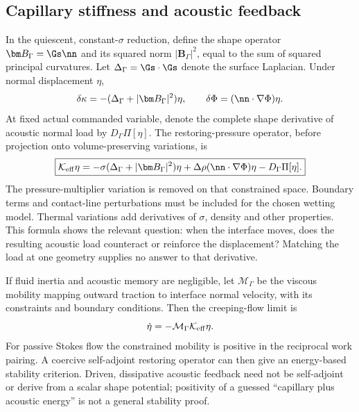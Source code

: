 \subsection{Capillary stiffness and acoustic feedback}
In the quiescent, constant-$\sigma$ reduction, define the shape operator
$\bm B_\Gamma=\Gs\nn$ and its squared norm $|\bm B_\Gamma|^2$, equal to the sum
of squared principal curvatures. Let $\Delta_\Gamma=\Gs\cdot\Gs$ denote the
surface Laplacian. Under normal displacement $\eta$,
\begin{equation}
 \delta\kappa=-(\Delta_\Gamma+|\bm B_\Gamma|^2)\eta,
 \qquad \delta\Phi=(\nn\cdot\nabla\Phi)\eta.
 \label{eq:curvature-variation}
\end{equation}
At fixed actual commanded variable, denote the complete shape derivative of
acoustic normal load by $D_\Gamma\Pi[\eta]$. The restoring-pressure operator,
before projection onto volume-preserving variations, is
\begin{equation}
 \boxed{\mathcal K_{\rm eff}\eta
 =-\sigma(\Delta_\Gamma+|\bm B_\Gamma|^2)\eta
    +\Delta\rho(\nn\cdot\nabla\Phi)\eta
    -D_\Gamma\Pi[\eta].}
 \label{eq:effective-stiffness}
\end{equation}
The pressure-multiplier variation is removed on that constrained space. Boundary
terms and contact-line perturbations must be included for the chosen wetting
model. Thermal variations add derivatives of $\sigma$, density and other
properties. This formula shows the relevant question: when the interface moves,
does the resulting acoustic load counteract or reinforce the displacement?
Matching the load at one geometry supplies no answer to that derivative.

If fluid inertia and acoustic memory are negligible, let $\mathcal M_\Gamma$
be the viscous mobility mapping outward traction to interface normal velocity,
with its constraints and boundary conditions. Then the creeping-flow limit is
\begin{equation}
 \dot\eta=-\mathcal M_\Gamma\mathcal K_{\rm eff}\eta.
 \label{eq:stokes-stability}
\end{equation}
For passive Stokes flow the constrained mobility is positive in the reciprocal
work pairing. A coercive self-adjoint restoring operator can then give an
energy-based stability criterion. Driven, dissipative acoustic feedback need
not be self-adjoint or derive from a scalar shape potential; positivity of a
guessed ``capillary plus acoustic energy'' is not a general stability proof.

